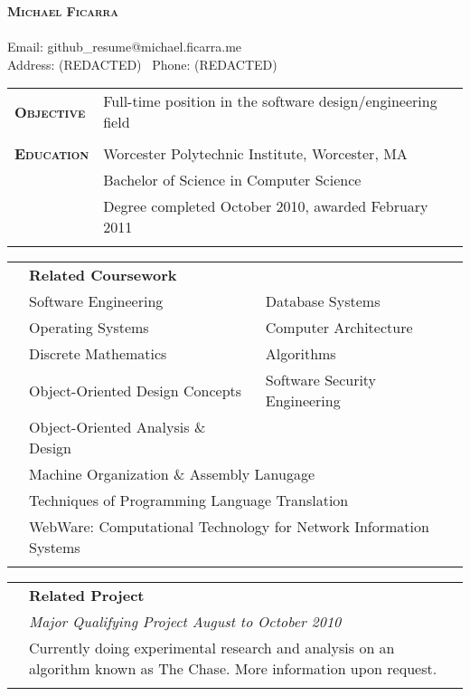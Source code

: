 \documentclass{report}
\begin{document}
\begin{center}
	{\huge \textbf{\textsc{Michael Ficarra}}}
	\\ ~ \\
	Email: github\_resume@michael.ficarra.me \\
	Address: (REDACTED) \textperiodcentered ~Phone: (REDACTED)
\end{center}

\begin{tabular}{@{}p{2.5cm}p{14cm}@{}}
	{\large \textsc{\textbf {Objective}}}   &   Full-time position in the software design/engineering field \\
	\\
	{\large \textsc{\textbf{Education}}}    &   Worcester Polytechnic Institute, Worcester, MA \\
	{}                                      &   Bachelor of Science in Computer Science \\
	{}                                      &   Degree completed October 2010, awarded February 2011 \\
	\\
\end{tabular}

\begin{tabular}{@{}p{2.5cm}p{7cm}p{7cm}@{}}
	{}   &   \multicolumn{2}{l}{ \textbf{Related Coursework} } \\
	{}   &   Software Engineering                 &   Database Systems \\
	{}   &   Operating Systems                    &   Computer Architecture \\
	{}   &   Discrete Mathematics                 &   Algorithms \\
	{}   &   Object-Oriented Design Concepts      &   Software Security Engineering \\
	{}   &   Object-Oriented Analysis \& Design   &   {}   \\
	{}   &   \multicolumn{2}{l}{ Machine Organization \& Assembly Lanugage } \\
	{}   &   \multicolumn{2}{l}{ Techniques of Programming Language Translation } \\
	{}   &   \multicolumn{2}{l}{ WebWare: Computational Technology for Network Information Systems } \\
	\\
\end{tabular}

\begin{tabular}{@{}p{2.5cm}p{14cm}@{}}
	{}   &   \textbf{Related Project} \\
	{}   &   {\em Major Qualifying Project \hfill August to October 2010} \\
	{}   &   Currently doing experimental research and analysis on an algorithm known as The Chase. More information upon request. \\
	\\
\end{tabular}
\end{document}
